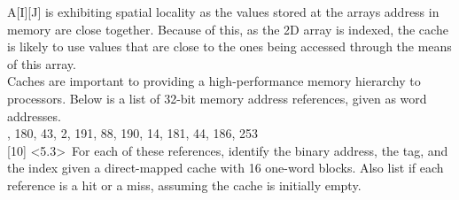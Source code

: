 \documentclass[12pt]{article}
\begin{document}
	\vspace{0.2cm}
	\noindent A[I][J] is exhibiting spatial locality as the values stored at the arrays address in memory are close together. Because of this, as the 2D array is indexed, the cache is likely to use values that are close to the ones being accessed through the means of this array. \vspace{0.8cm} \\
	
	
	\noindent {} 
	Caches are important to providing a high-performance memory hierarchy
	to processors. Below is a list of 32-bit memory address references, given as word
	addresses. \vspace{0.3cm} \\
	
	, 180, 43, 2, 191, 88, 190, 14, 181, 44, 186, 253  \vspace{0.3cm} \\
	
	\noindent {} 
	[10] \textless5.3\textgreater \ For each of these references, identify the binary address, the tag,
	and the index given a direct-mapped cache with 16 one-word blocks. Also list if each
	reference is a hit or a miss, assuming the cache is initially empty. \\
	
\end{document}
